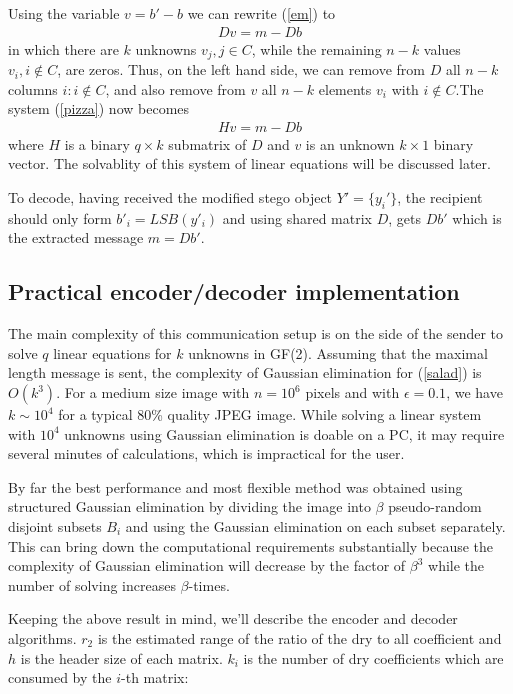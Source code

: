 Using the variable $v=b' - b$ we can rewrite (\ref{em}) to
\begin{eqnarray}
Dv=m-Db
\label{pizza}
\end{eqnarray}
in which there are $k$ unknowns $v_j, j\in C$, while the remaining $n - k$ 
values $v_i, i \notin C$, are zeros. Thus, on the left hand side, we can 
remove from $D$ all $n - k$ columns $i : i\notin C$, and also remove from $v$ 
all $n - k$ elements $v_i$ with $i \notin C$.The system (\ref{pizza}) now 
becomes 
\begin{eqnarray}
Hv = m - Db
\label{salad}
\end{eqnarray}
where $H$ is a binary $q \times k$ submatrix of $D$ and $v$ is an unknown $k\times 1$ 
binary vector. The solvablity of this system of linear equations will be discussed later. 

To decode, having received the modified stego object $Y'=\{y_i'\}$, the 
recipient should only form $b'_i=LSB(y'_i)$ and using shared matrix $D$, 
gets $Db'$ which is the extracted message $m=Db'$.

\subsection{Practical encoder/decoder implementation}
\label{ChapAlgSecWetSubPrac}
The main complexity of this communication setup is on the side of
the sender to solve $q$ linear equations for $k$ unknowns in GF(2). 
Assuming that the maximal length message is sent, the complexity 
of Gaussian elimination for (\ref{salad}) is $O(k^3)$. 
For a medium size image with $n=10^6$ pixels and with $\epsilon=0.1$, 
we have $k \sim 10^4$ for a typical 80\% quality JPEG image. 
While solving a linear system with $10^4$ unknowns using Gaussian 
elimination is doable on a PC, it may require several minutes of 
calculations, which is impractical for the user.

By far the best performance and most flexible method was obtained
using structured Gaussian elimination by dividing the image into $\beta$
pseudo-random disjoint subsets $B_i$ and using the Gaussian elimination on each subset separately. This can bring down the
computational requirements substantially because the complexity of 
Gaussian elimination will decrease by the factor of $\beta^3$ while the 
number of solving increases $\beta$-times.

Keeping the above result in mind, we'll describe the encoder and decoder 
algorithms. $r_2$ is the estimated range of the ratio of the dry to all coefficient
and $h$ is the header size of each matrix. $k_i$ is the number of dry coefficients which are consumed by the $i$-th matrix:


